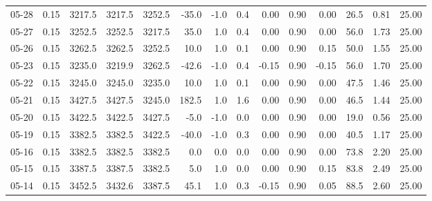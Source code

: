 \begin{threeparttable}
{\begin{tabular}{lrrrrrrrrrrrrr}
  05-28 &     0.15 & 3217.5 & 3217.5 & 3252.5 &      -35.0 &                     -1.0 &                 0.4 &       0.00 &      0.90 &           0.00 &             26.5 &            0.81 &                  25.00 \\
  05-27 &     0.15 & 3252.5 & 3252.5 & 3217.5 &       35.0 &                      1.0 &                 0.4 &       0.00 &      0.90 &           0.00 &             56.0 &            1.73 &                  25.00 \\
  05-26 &     0.15 & 3262.5 & 3262.5 & 3252.5 &       10.0 &                      1.0 &                 0.1 &       0.00 &      0.90 &           0.15 &             50.0 &            1.55 &                  25.00 \\
  05-23 &     0.15 & 3235.0 & 3219.9 & 3262.5 &      -42.6 &                     -1.0 &                 0.4 &      -0.15 &      0.90 &          -0.15 &             56.0 &            1.70 &                  25.00 \\
  05-22 &     0.15 & 3245.0 & 3245.0 & 3235.0 &       10.0 &                      1.0 &                 0.1 &       0.00 &      0.90 &           0.00 &             47.5 &            1.46 &                  25.00 \\
  05-21 &     0.15 & 3427.5 & 3427.5 & 3245.0 &      182.5 &                      1.0 &                 1.6 &       0.00 &      0.90 &           0.00 &             46.5 &            1.44 &                  25.00 \\
  05-20 &     0.15 & 3422.5 & 3422.5 & 3427.5 &       -5.0 &                     -1.0 &                 0.0 &       0.00 &      0.90 &           0.00 &             19.0 &            0.56 &                  25.00 \\
  05-19 &     0.15 & 3382.5 & 3382.5 & 3422.5 &      -40.0 &                     -1.0 &                 0.3 &       0.00 &      0.90 &           0.00 &             40.5 &            1.17 &                  25.00 \\
  05-16 &     0.15 & 3382.5 & 3382.5 & 3382.5 &        0.0 &                      0.0 &                 0.0 &       0.00 &      0.90 &           0.00 &             73.8 &            2.20 &                  25.00 \\
  05-15 &     0.15 & 3387.5 & 3387.5 & 3382.5 &        5.0 &                      1.0 &                 0.0 &       0.00 &      0.90 &           0.15 &             83.8 &            2.49 &                  25.00 \\
  05-14 &     0.15 & 3452.5 & 3432.6 & 3387.5 &       45.1 &                      1.0 &                 0.3 &      -0.15 &      0.90 &           0.05 &             88.5 &            2.60 &                  25.00 \\

\end{tabular}}
\end{threeparttable}
